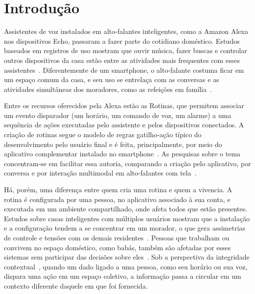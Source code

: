 \section{Introdução}
\label{sec:introducao}

Assistentes de voz instalados em alto-falantes inteligentes, como a Amazon
Alexa nos dispositivos Echo, passaram a fazer parte do cotidiano doméstico.
Estudos baseados em registros de uso mostram que ouvir música, fazer buscas
e controlar outros dispositivos da casa estão entre as atividades mais
frequentes com esses assistentes~\cite{ammari2019music}. Diferentemente de
um smartphone, o alto-falante costuma ficar em um espaço comum da casa, e
seu uso se entrelaça com as conversas e as atividades simultâneas dos
moradores, como as refeições em família~\cite{porcheron2018voice}.

Entre os recursos oferecidos pela Alexa estão as Rotinas, que permitem
associar um evento disparador (um horário, um comando de voz, um alarme) a
uma sequência de ações executadas pelo assistente e pelos dispositivos
conectados. A criação de rotinas segue o modelo de regras gatilho-ação
típico do desenvolvimento pelo usuário final e é feita, principalmente, por
meio do aplicativo complementar instalado no
smartphone~\cite{barricelli2024routines,barricelli2022multimodal}. As
pesquisas sobre o tema concentram-se em facilitar essa autoria, comparando
a criação pelo aplicativo, por conversa e por interação multimodal em
alto-falantes com tela~\cite{barricelli2024routines,barricelli2022multimodal}.

Há, porém, uma diferença entre quem cria uma rotina e quem a vivencia. A
rotina é configurada por uma pessoa, no aplicativo associado à sua conta, e
executada em um ambiente compartilhado, onde afeta todos que estão
presentes. Estudos sobre casas inteligentes com múltiplos usuários mostram
que a instalação e a configuração tendem a se concentrar em um morador, o
que gera assimetrias de controle e tensões com os demais
residentes~\cite{geeng2019control,zeng2019multiuser}. Pessoas que trabalham
ou convivem no espaço doméstico, como babás, também são afetadas por esses
sistemas sem participar das decisões sobre eles~\cite{bernd2020bystanders}.
Sob a perspectiva da integridade contextual~\cite{nissenbaum2004privacy},
quando um dado ligado a uma pessoa, como seu horário ou sua voz, dispara
uma ação em um espaço coletivo, a informação passa a circular em um
contexto diferente daquele em que foi fornecida.

